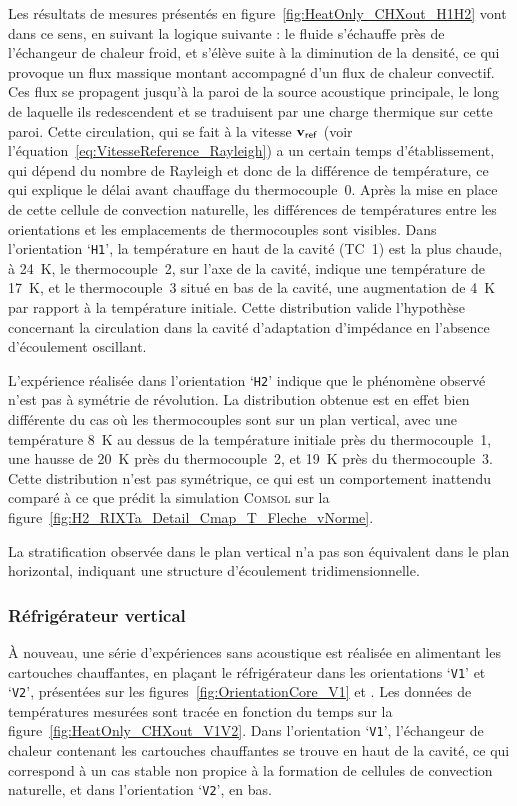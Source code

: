 Les résultats de mesures présentés en figure~\ref{fig:HeatOnly_CHXout_H1H2} vont dans ce sens, en suivant la logique suivante : le fluide s'échauffe près de l'échangeur de chaleur froid, et s'élève suite à la diminution de la densité, ce qui provoque un flux massique montant accompagné d'un flux de chaleur convectif. Ces flux se propagent jusqu'à la paroi de la source acoustique principale, le long de laquelle ils redescendent et se traduisent par une charge thermique sur cette paroi. Cette circulation, qui se fait à la vitesse $\mathbf v_{\sf ref}$ (voir l'équation~\eqref{eq:VitesseReference_Rayleigh}) a un certain temps d'établissement, qui dépend du nombre de Rayleigh et donc de la différence de température, ce qui explique le délai avant chauffage du thermocouple~\num{0}. Après la mise en place de cette cellule de convection naturelle, les différences de températures entre les orientations et les emplacements de thermocouples sont visibles. Dans l'orientation `\texttt{H1}', la température en haut de la cavité (TC~\num{1}) est la plus chaude, à \qty{24}{\kelvin}, le thermocouple~\num{2}, sur l'axe de la cavité, indique une température de \qty{17}{\kelvin}, et le thermocouple~\num{3} situé en bas de la cavité, une augmentation de \qty{4}{\kelvin} par rapport à la température initiale. Cette distribution valide l'hypothèse concernant la circulation dans la cavité d'adaptation d'impédance en l'absence d'écoulement oscillant.

L'expérience réalisée dans l'orientation `\texttt{H2}' indique que le phénomène observé n'est pas à symétrie de révolution. La distribution obtenue est en effet bien différente du cas où les thermocouples sont sur un plan vertical, avec une température \qty{8}{\kelvin} au dessus de la température initiale près du thermocouple~\num{1}, une hausse de \qty{20}{\kelvin} près du thermocouple~\num{2}, et \qty{19}{\kelvin} près du thermocouple~\num{3}. Cette distribution n'est pas symétrique, ce qui est un comportement inattendu comparé à ce que prédit la simulation \textsc{Comsol} sur la figure~\ref{fig:H2_RIXTa_Detail_Cmap_T_Fleche_vNorme}.\bigskip

La stratification observée dans le plan vertical n'a pas son équivalent dans le plan horizontal, indiquant une structure d'écoulement tridimensionnelle.

\subsubsection{Réfrigérateur vertical}
À nouveau, une série d'expériences sans acoustique est réalisée en alimentant les cartouches chauffantes, en plaçant le réfrigérateur dans les orientations `\texttt{V1}' et `\texttt{V2}', présentées sur les figures~\ref{fig:OrientationCore_V1} et . Les données de températures mesurées sont tracée en fonction du temps sur la figure~\ref{fig:HeatOnly_CHXout_V1V2}. Dans l'orientation `\texttt{V1}', l'échangeur de chaleur contenant les cartouches chauffantes se trouve en haut de la cavité, ce qui correspond à un cas stable non propice à la formation de cellules de convection naturelle, et dans l'orientation `\texttt{V2}', en bas.

